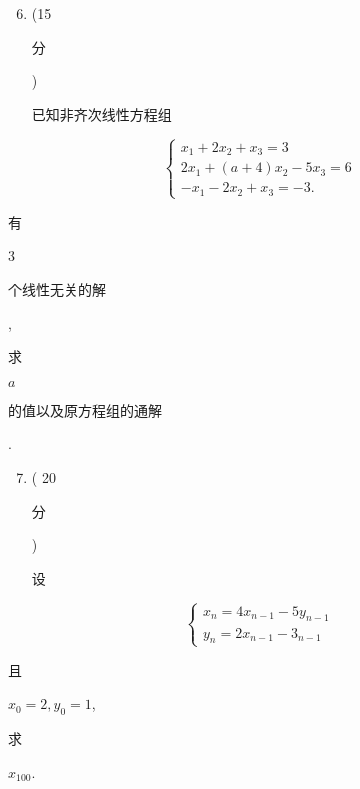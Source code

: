\documentclass[10pt]{article}
\begin{document}
\begin{enumerate}
  \setcounter{enumi}{5}
  \item (15 \begin{CJK}{UTF8}{mj}分\end{CJK}) \begin{CJK}{UTF8}{mj}已知非齐次线性方程组\end{CJK}
\end{enumerate}
$$
\left\{\begin{array}{l}
x_{1}+2 x_{2}+x_{3}=3 \\
2 x_{1}+(a+4) x_{2}-5 x_{3}=6 \\
-x_{1}-2 x_{2}+x_{3}=-3 .
\end{array}\right.
$$
\begin{CJK}{UTF8}{mj}有\end{CJK} 3 \begin{CJK}{UTF8}{mj}个线性无关的解\end{CJK}, \begin{CJK}{UTF8}{mj}求\end{CJK} $a$ \begin{CJK}{UTF8}{mj}的值以及原方程组的通解\end{CJK}.

\begin{enumerate}
  \setcounter{enumi}{6}
  \item ( 20 \begin{CJK}{UTF8}{mj}分\end{CJK}) \begin{CJK}{UTF8}{mj}设\end{CJK}
\end{enumerate}
$$
\left\{\begin{array}{l}
x_{n}=4 x_{n-1}-5 y_{n-1} \\
y_{n}=2 x_{n-1}-3_{n-1}
\end{array}\right.
$$
\begin{CJK}{UTF8}{mj}且\end{CJK} $x_{0}=2, y_{0}=1$, \begin{CJK}{UTF8}{mj}求\end{CJK} $x_{100}$.
\end{document}
